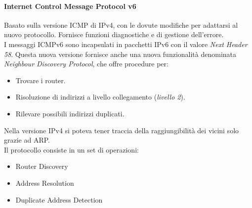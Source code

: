 \documentclass{article}
\begin{document}
\paragraph{Internet Control Message Protocol v6}
Basato sulla versione ICMP di IPv4, con le dovute modifiche per adattarsi al nuovo protocollo. Fornisce funzioni diagnostiche e di gestione dell'errore.\\
I messaggi ICMPv6 sono incapsulati in pacchetti IPv6 con il valore \textit{Next Header 58}. Questa nuova versione fornisce anche una nuova funzionalità denominata \textit{Neighbour Discovery Protocol}, che offre procedure per:
\begin{itemize}
    \item Trovare i router.
    \item Risoluzione di indirizzi a livello collegamento (\textit{livello 2}).
    \item Rilevare possibili indirizzi duplicati.
\end{itemize}
Nella versione IPv4 si poteva tener traccia della raggiungibilità dei vicini solo grazie ad ARP.\\ Il protocollo consiste in un set di operazioni:
\begin{itemize}
    \item Router Discovery
    \item Address Resolution
    \item Duplicate Address Detection
\end{itemize}
\end{document}

